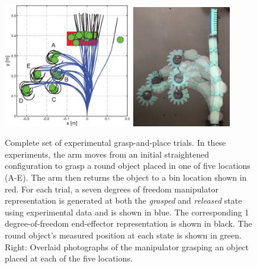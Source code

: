 \begin{figure}[htbp]
\begin{centering}
  \includegraphics[width=0.5\textwidth]{Figures/experimental_results/allTestsOverlaid.eps}
\includegraphics[width=0.385\textwidth]{figures/experimental_results/five_grasps.jpg}
\caption[Left: All 25 experimental grasping trials.]{Complete set of experimental grasp-and-place trials. In these experiments, the arm moves from an initial straightened configuration to grasp a round object placed in one of five locations (A-E). The arm then returns the object to a bin location shown in red. For each trial, a seven degrees of freedom manipulator representation is generated at both the \emph{grasped} and \emph{released} state using experimental data and is shown in blue. The corresponding 1 degree-of-freedom end-effector representation is shown in black. The round object's measured position at each state is shown in green. Right: Overlaid photographs of the manipulator grasping an object placed at each of the five locations. }\label{fig:allTestsOverlaid}
\end{centering}
\end{figure}

